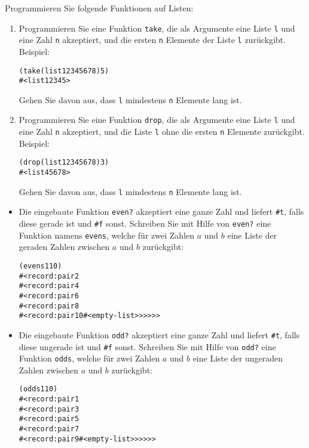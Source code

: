 \begin{aufgabe}
  Programmieren Sie folgende Funktionen auf Listen:
  \begin{enumerate}
  \item Programmieren Sie eine Funktion \texttt{take}, die als
    Argumente eine Liste \texttt{l} und eine Zahl \texttt{n}
    akzeptiert, und die ersten \texttt{n} Elemente der Liste
    \texttt{l} zurückgibt. Beispiel:
    \begin{alltt}
      (take (list 1 2 3 4 5 6 7 8) 5)
      \evalsto{} #<list 1 2 3 4 5>
    \end{alltt}
    Gehen Sie davon aus, dass \texttt{l} mindestens \texttt{n}
    Elemente lang ist.

  \item Programmieren Sie eine Funktion \texttt{drop}, die als
    Argumente eine Liste \texttt{l} und eine Zahl \texttt{n}
    akzeptiert, und die Liste \texttt{l} ohne die ersten \texttt{n}
    Elemente zurückgibt.  Beispiel:
    \begin{alltt}
      (drop (list 1 2 3 4 5 6 7 8) 3)
      \evalsto{} #<list 4 5 6 7 8>
    \end{alltt}
    Gehen Sie davon aus, dass \texttt{l} mindestens \texttt{n}
    Elemente lang ist.
    \end{enumerate}
\end{aufgabe}


\begin{aufgabe}\label{ex:evensodds}
  \begin{itemize}
  \item
    Die eingebaute Funktion \texttt{even?}
    akzeptiert eine ganze Zahl und liefert \verb|#t|, falls diese
    gerade ist und \verb|#f| sonst.
    Schreiben Sie mit Hilfe von \texttt{even?}
    eine Funktion namens \texttt{evens}, welche für zwei
    Zahlen $a$ und $b$ eine Liste der geraden Zahlen zwischen $a$ und
    $b$ zurückgibt:
\begin{alltt}
(evens 1 10)
\evalsto{} #<record:pair 2
     #<record:pair 4
       #<record:pair 6
         #<record:pair 8
           #<record:pair 10 #<empty-list>>>>>>
\end{alltt}
  \item
    Die eingebaute Funktion \texttt{odd?}
    akzeptiert eine ganze Zahl und liefert \verb|#t|, falls diese
    ungerade ist und \verb|#f| sonst.
    Schreiben Sie mit Hilfe von \texttt{odd?} eine Funktion \texttt{odds}, welche für zwei
    Zahlen $a$ und $b$ eine Liste der ungeraden Zahlen zwischen $a$ und $b$
    zurückgibt:
\begin{alltt}
(odds 1 10)
\evalsto{} #<record:pair 1
     #<record:pair 3
       #<record:pair 5
         #<record:pair 7
           #<record:pair 9 #<empty-list>>>>>>
\end{alltt}
  \end{itemize}
\end{aufgabe}


